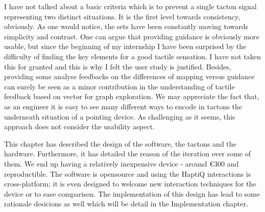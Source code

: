 I have not talked about a basic criteria which is to prevent a single
tacton signal representing two distinct situations. It is the first
level towards consistency, obviously. As one would notice, the sets have
been constantly moving towards simplicity and contrast. One can argue
that providing guidance is obviously more usable, but since the
beginning of my internship I have been surprised by the difficulty of
finding the key elements for a good tactile sensation. I have not taken
this for granted and this is why I felt the user study is justified.
Besides, providing some analyse feedbacks on the differences of mapping
versus guidance can surely be seen as a minor contribution in the
understanding of tactile feedback based on vector for graph exploration.
We may appreciate the fact that, as an engineer it is easy to see many
different ways to encode in tactons the underneath situation of a
pointing device. As challenging as it seems, this approach does not
consider the usability aspect.

This chapter has described the design of the software, the tactons and
the hardware. Furthermore, it has detailed the reason of the iteration
over some of them. We end up having a relatively inexpensive device -
around \euro{300} and reproductible. The software is opensource and
using the HaptiQ interactions is cross-platform; it is even designed to
welcome new interaction techniques for the device or to ease comparison.
The implementation of this design has lead to some rationale desicions
as well which will be detail in the Implementation chapter.
